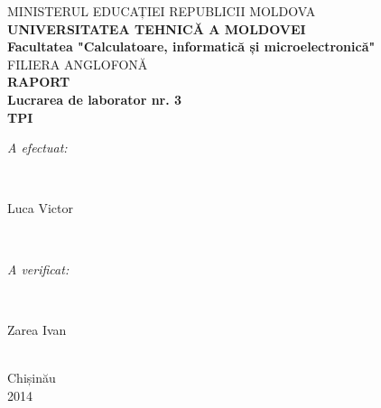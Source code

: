 \documentclass[12pt,a4paper]{article}
\begin{document}
\begin{titlepage}

\center

\textsc{ MINISTERUL EDUCAȚIEI REPUBLICII MOLDOVA}\\
\textbf{UNIVERSITATEA TEHNICĂ A MOLDOVEI}\\
\textbf{Facultatea "Calculatoare, informatică și microelectronică"}\\
\textsc{FILIERA ANGLOFONĂ}\\[2cm]

{ \huge \bfseries RAPORT}\\[0.5cm] %
\textbf{Lucrarea de laborator nr. 3}\\
\textbf{TPI}\\[5cm]


\begin{minipage}{0.4\textwidth}
\begin{flushleft} \large
\emph{A efectuat:}\\
\end{flushleft}
\end{minipage}
~
\begin{minipage}{0.4\textwidth}
\begin{flushright} \large
Luca Victor\\
\end{flushright}
\end{minipage}\\[1cm]

\begin{minipage}{0.4\textwidth}
\begin{flushleft} \large
\emph{A verificat:}\\
\end{flushleft}
\end{minipage}
~
\begin{minipage}{0.4\textwidth}
\begin{flushright} \large
Zarea Ivan
\end{flushright}
\end{minipage}\\[4.5cm]

{\large Chișinău}\\
2014\\[3cm] %



\vfill %

\end{titlepage}
 \newpage
\end{document}
